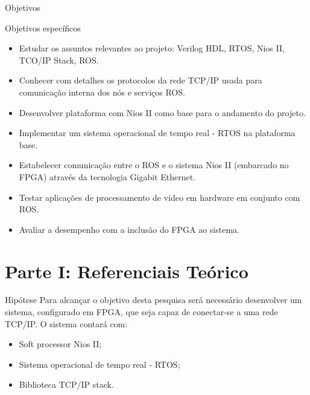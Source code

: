 \documentclass[10pt]{beamer}
\begin{document}
{
\begin{frame}{Objetivos}
	\begin{alertblock}{Objetivos específicos}
        \begin{itemize}
        	\item Estudar os assuntos relevantes ao projeto: Verilog HDL, RTOS, Nios II, TCO/IP Stack, ROS.
        	\item Conhecer com detalhes os protocolos da rede TCP/IP usada para comunicação interna dos nós e serviços ROS.
        	\item Desenvolver plataforma com Nios II como base para o andamento do projeto.
        	\item Implementar um sistema operacional de tempo real - RTOS na plataforma base.
        	\item Estabelecer comunicação entre o ROS e o sistema Nios II (embarcado no FPGA) através da tecnologia Gigabit Ethernet.
        	\item Testar aplicações de processamento de vídeo em hardware em conjunto com ROS.
        	\item Avaliar a desempenho com a inclusão do FPGA ao sistema.
        \end{itemize}
	\end{alertblock}
\end{frame}
}

\section{Parte I: Referenciais Teórico}
{
\begin{frame}{Hipótese}
	Para alcançar o objetivo desta pesquisa será necessário desenvolver um sistema, configurado em FPGA, que seja capaz de conectar-se a uma rede TCP/IP. O sistema contará com:
	\begin{itemize}
		\item Soft processor Nios II;
		\item Sistema operacional de tempo real - RTOS;
		\item Biblioteca TCP/IP stack.
	\end{itemize}

\end{frame}
}
\end{document}
